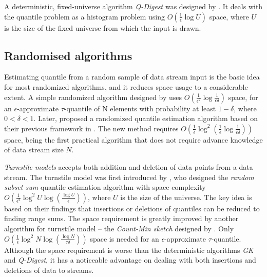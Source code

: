 A deterministic, fixed-universe algorithm \textit{Q-Digest} was designed by \citeauthor{shrivastavaMediansNewAggregation2004b}\cite{shrivastavaMediansNewAggregation2004b}. It deals with the quantile problem as a histogram problem using $O (\frac{1}{\epsilon}\log U)$ space, where $U$ is the size of the fixed universe from which the input is drawn.


\subsection{Randomised algorithms}
\label{randomised}

Estimating quantile from a random sample of data stream input is the basic idea for most randomized algorithms, and it reduces space usage to a considerable extent.
A simple randomized algorithm designed by \citeauthor{floydExpectedTimeBounds1975}\cite{floydExpectedTimeBounds1975} uses $O(\frac{1}{\epsilon^2} \log \frac{1}{\epsilon \delta})$ space, for an $\epsilon$-approximate $\tau$-quantile of N elements with probability at least $1 - \delta$, where $0 < \delta < 1$.
Later, \citeauthor{mankuRandomSamplingTechniques1999}\cite{mankuRandomSamplingTechniques1999} proposed a randomized quantile estimation algorithm based on their previous framework in \cite{mankuApproximateMediansOther1998}. The new method requires 
$O(
    \frac{1}{\epsilon} \log^2 
    (\frac{1}{\epsilon} 
        \log \frac{1}{\epsilon \delta}
    )
)
$
space, being the first practical algorithm that does not require advance knowledge of data stream size $N$.

\textit{Turnstile models} accepts both addition and deletion of data points from a data stream.
The turnstile model was first introduced by \citeauthor{gilbertChapter40How2002}\cite{gilbertChapter40How2002}, who designed the \textit{random subset sum} quantile estimation algorithm with space complexity 
$O(\frac{1}{\epsilon^2} \log^2 U \log (\frac{\log U}{\epsilon}))$, where $U$ is the size of the universe. 
The key idea is based on their findings that insertions or deletions of quantiles can be reduced to finding range sums.
The space requirement is greatly improved by another algorithm for turnstile model -- the \textit{Count-Min sketch} designed by \citeauthor{cormodeImprovedDataStream2005}\cite{cormodeImprovedDataStream2005}. Only 
$O(\frac{1}{\epsilon} \log^2 N \log (\frac{\log N}{\tau \delta}))$ space is needed for an $\epsilon$-approximate $\tau$-quantile. Although the space requirement is worse than the deterministic algorithms \textit{GK} and \textit{Q-Digest}, it has a noticeable advantage on dealing with both insertions and deletions of data to streams.

